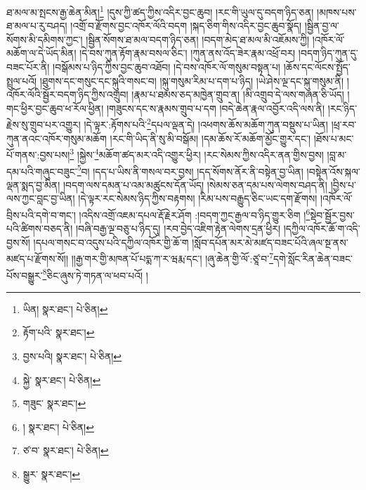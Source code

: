 ཐ་མལ་མ་སྤངས་རྒྱ་ཆེན་མིན།\footnote{ཡིན།  སྣར་ཐང་།  པེ་ཅིན། } །དུས་ཀྱི་ཚད་ཀྱིས་འདིར་བྱང་ཆུབ། །རང་གི་ཡུལ་དུ་བདག་ཉིད་ཅན། །མཁས་པས་ཐ་མལ་པ་རུ་བཤད། །འགྲོ་བ་རྫོགས་བྱང་འཁོར་ལོའི་བདག །སྐད་ཅིག་གིས་འདིར་བྱང་ཆུབ་སྣོད། །སྦྱིན་བྱ་ལ་སོགས་མི་དམིགས་ཀྱང་། །སྦྱིན་སོགས་ཐ་མལ་བདག་ཉིད་ཅན། །བདག་མེད་ཐ་མལ་མི་འཇོམས་ཀྱི། །འཁོར་ལོ་མཆོག་ལ་དེ་ཡོད་མིན། །དེ་བས་ཀུན་རྟོག་རྣམ་བསལ་ཅིང་། །ཀུན་ནས་འོད་ཟེར་རྣམ་འཕྲོ་བར། །བདག་ཉིད་ཀུན་དུ་བཟང་པོར་ནི། །བསྒོམས་པ་ཉིད་ཀྱིས་བྱང་ཆུབ་འཐོབ། །དེ་བས་འཁོར་ལོ་གསུམ་བསྟན་པ། །ཆོས་དང་ལོངས་སྤྱོད་སྤྲུལ་པའོ། །ཐུགས་དང་གསུང་དང་སྐུའི་གསང་བ། །སྐུ་གསུམ་རིམ་པ་དག་པ་ཉིད། །ཡེ་ཤེས་ལྔ་དང་སྐུ་གསུམ་ནི། །འཁོར་ལོའི་སྦྱོར་བདག་ཉིད་ཀྱིས་འགྲུབ། །རྣམ་པ་ཐམས་ཅད་མཁྱེན་གྲུབ་ན། །མི་འགྲུབ་དེ་ལས་གཞན་ཅི་ཡོད། །གང་ཕྱིར་བྱང་ཆུབ་ཕ་རོལ་ཕྱིན། །གཟུངས་དང་ས་རྣམས་གྲུབ་པ་དག །བདེ་ཆེན་རྣལ་འབྱོར་འདི་ལས་ནི། །རང་ཉིད་རྗེས་སུ་གྲུབ་པར་འགྱུར། །དེ་ལྟར་:རྟོགས་པའི་\footnote{རྟོག་པའི་  སྣར་ཐང་། }དཔལ་ལྡན་དེ། །འཕགས་ཆོས་མཆོག་ཀུན་བསྡུས་པ་ཡིན། །ཕྲ་རབ་ཀུན་ནའང་འཁོར་གསུམ་མཆོག །རང་གི་ཡིད་ནི་སུ་མི་བསྒོམ། །དམ་ཆོས་རོ་མཆོག་མྱོང་གྱུར་དང་། །ཐོས་པ་མང་པོ་གནས་:བྱས་པས།\footnote{བྱས་པའི།  སྣར་ཐང་།  པེ་ཅིན། } །སྐྱེས་\footnote{སྐྱེ་  སྣར་ཐང་།  པེ་ཅིན། }མཆོག་ཚད་མར་འདི་འགྱུར་ཕྱིར། །རང་སེམས་ཀྱིས་འདིར་ནན་གྱིས་བྱས། །བླ་མ་དམ་པའི་གཞུང་བཟུང་\footnote{གཟུང་  སྣར་ཐང་། }བ། །དད་པ་ཡིས་ནི་གསལ་བར་བྱས། །དད་སོགས་ནོར་ནི་བསྟེན་བྱ་ཡིན། །བསྟེན་འོས་སྐལ་ལྡན་སྨད་བྱ་མིན། །བདག་ལས་དམན་པ་འམ་མཚུངས་དོན་ཡོད། །སེམས་ཅན་དམ་པས་ལེགས་བཤད་ནི། །བྱིས་པ་ལས་ཀྱང་བླང་བྱ་ཡིན། །དེ་ལྟར་རང་སེམས་ཉིད་ཀྱིས་བརྟགས། །རིམ་པས་བརྒྱུད་ཅིང་ཡང་དག་རྫོགས། །འཁོར་ལོ་བྲིས་པའི་དགེ་བ་གང་། །འདིས་འགྲོ་འཇམ་དཔལ་རྡོ་རྗེར་ཤོག :།བདག་ཀྱང་རྒྱལ་བ་ཉིད་གྱུར་ཅིག །\footnote{།  སྣར་ཐང་།  པེ་ཅིན། }སྡེབ་སྦྱོར་བྱས་པའི་ཚིགས་བཅད་ནི། །བཞི་བརྒྱ་ལྔ་བཅུ་པ་ཉིད་དུ། །རབ་བྱེད་འཇིག་རྟེན་ལེགས་དྲན་ཕྱིར། །དཀྱིལ་འཁོར་ཆོ་ག་འདི་བྱས་སོ། །དཔལ་གསང་བ་འདུས་པའི་དཀྱིལ་འཁོར་གྱི་ཆོ་ག །སློབ་དཔོན་མར་མེ་མཛད་བཟང་པོའི་ཞལ་སྔ་ནས་མཛད་པ་རྫོགས་སོ།། །།རྒྱ་གར་གྱི་མཁན་པོ་པདྨ་ཀ་ར་ཝརྨ་དང་། །ཞུ་ཆེན་གྱི་ལོ་:ཙཱ་བ་\footnote{ཙ་བ་  སྣར་ཐང་།  པེ་ཅིན། }དགེ་སློང་རིན་ཆེན་བཟང་པོས་བསྒྱུར་\footnote{སྒྱུར་  སྣར་ཐང་། }ཅིང་ཞུས་ཏེ་གཏན་ལ་ཕབ་པའོ། ། 